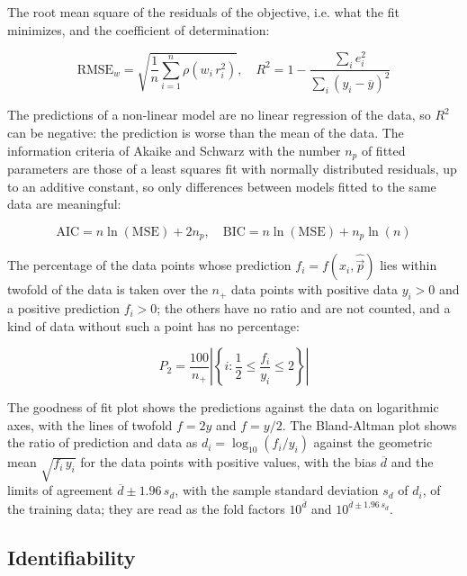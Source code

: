 \documentclass{article}
\begin{document}
The root mean square of the residuals of the objective, i.e. what the fit minimizes, and the coefficient of determination:

\begin{equation}
\mathrm{RMSE}_w = \sqrt{\frac{1}{n} \sum_{i=1}^{n} \rho\left(w_i\, r_i^2\right)}, \quad R^2 = 1 - \frac{\sum_{i} e_i^2}{\sum_{i} \left(y_i - \overline{y}\right)^2}
\end{equation}

The predictions of a non-linear model are no linear regression of the data, so $R^2$ can be negative: the prediction is worse than the mean of the data. The information criteria of Akaike \cite{Akaike1974} and Schwarz \cite{Schwarz1978} with the number $n_p$ of fitted parameters are those of a least squares fit with normally distributed residuals, up to an additive constant, so only differences between models fitted to the same data are meaningful:

\begin{equation}
\mathrm{AIC} = n \ln(\mathrm{MSE}) + 2 n_p, \quad \mathrm{BIC} = n \ln(\mathrm{MSE}) + n_p \ln(n)
\end{equation}

The percentage of the data points whose prediction $f_i = f(x_i, \hat{\vec{p}})$ lies within twofold of the data is taken over the $n_+$ data points with positive data $y_i > 0$ and a positive prediction $f_i > 0$; the others have no ratio and are not counted, and a kind of data without such a point has no percentage:

\begin{equation}
P_2 = \frac{100}{n_+} \left|\left\{ i : \frac{1}{2} \le \frac{f_i}{y_i} \le 2 \right\}\right|
\end{equation}

The goodness of fit plot shows the predictions against the data on logarithmic axes, with the lines of twofold $f = 2y$ and $f = y/2$. The Bland-Altman plot \cite{Bland1986} shows the ratio of prediction and data as $d_i = \log_{10}(f_i / y_i)$ against the geometric mean $\sqrt{f_i\, y_i}$ for the data points with positive values, with the bias $\overline{d}$ and the limits of agreement $\overline{d} \pm 1.96\, s_d$, with the sample standard deviation $s_d$ of $d_i$, of the training data; they are read as the fold factors $10^{\overline{d}}$ and $10^{\overline{d} \pm 1.96\, s_d}$.

\subsection{Identifiability}
\end{document}
